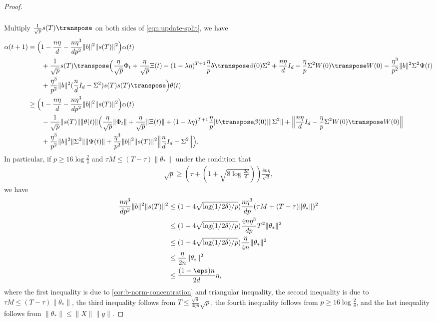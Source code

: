 \begin{proof}
\begin{align}
\begin{split}
        \end{split}
    \end{align}
    Multiply $\frac{1}{\sqrt{p}} s(T)\transpose$ on both sides of \cref{eqn:update-split}, we have
    \begin{align*}
        \alpha(t+1) & = \Big( 1 - \frac{n\eta}{d} - \frac{n\eta^3}{dp^2} \|b\|^2 \|s(T)\|^2 \Big) \alpha(t) \\
        & \qquad + \frac{1}{\sqrt{p}} s(T)\transpose \Big( \frac{\eta}{\sqrt{p}} \Phi_t + \frac{\eta}{\sqrt p}\Xi(t)  - (1-\lambda\eta)^{T+1} \frac{\eta}{p} b\transpose\beta(0) \Sigma^2 + \frac{n\eta}{d}I_d - \frac{\eta}{p}\Sigma^2 W(0)\transpose W(0) - \frac{\eta^3}{p^2} \|b\|^2 \Sigma^2 \Psi(t) \\
        & \qquad + \frac{\eta^3}{p^2} \|b\|^2 (\frac{n}{d}I_d - \Sigma^2) s(T) s(T)\transpose \Big)\theta(t) \\
        & \geq \Big( 1 - \frac{n\eta}{d} - \frac{n\eta^3}{dp^2} \|b\|^2 \|s(T)\|^2 \Big) \alpha(t) \\
        & \qquad - \frac{1}{\sqrt{p}} \|s(T)\|\|\theta(t)\| \Big( \frac{\eta}{\sqrt{p}} \|\Phi_t\| + \frac{\eta}{\sqrt p} \|\Xi(t)\| + (1-\lambda\eta)^{T+1} \frac{\eta}{p} |b\transpose\beta(0)| \|\Sigma^2\| + \Big\| \frac{n\eta}{d}I_d - \frac{\eta}{p}\Sigma^2 W(0)\transpose W(0) \Big\| \\
        & \qquad + \frac{\eta^3}{p^2} \|b\|^2 \|\Sigma^2\| \|\Psi(t)\| + \frac{\eta^3}{p^2} \|b\|^2 \|s(T)\|^2 \Big\| \frac{n}{d}I_d - \Sigma^2 \Big\| \Big).
    \end{align*}
    In particular, if $p \geq 16\log\frac{2}{\delta}$ and $\tau M \leq (T-\tau) \|\theta_*\|$ under the condition that
    \begin{align*}
        \sqrt{p} \geq \left( \tau + \left(1 + \sqrt{8\log\frac{2d}{\delta}}\right) \right) \frac{8n\eta}{\sqrt{d}},
    \end{align*}
    we have
    \begin{align*}
        \frac{n\eta^3}{dp^2} \|b\|^2 \|s(T)\|^2 & \leq (1 + 4\sqrt{\log(1/2\delta)/p}) \frac{n\eta^3}{dp} (\tau M + (T-\tau) \|\theta_*\|)^2 \\
        & \leq (1 + 4\sqrt{\log(1/2\delta)/p}) \frac{4n\eta^3}{dp} T^2 \|\theta_*\|^2 \\
        & \leq (1 + 4\sqrt{\log(1/2\delta)/p}) \frac{\eta}{4n} \|\theta_*\|^2 \\
        & \leq \frac{\eta}{2n} \|\theta_*\|^2 \\
        & \leq \frac{(1+\eps)n}{2d}\eta,
    \end{align*}
    where the first inequality is due to \cref{cor:b-norm-concentration} and triangular inequality, the second inequality is due to $\tau M \leq (T-\tau) \|\theta_*\|$, the third inequality follows from $T \leq \frac{\sqrt{d}}{4\eta n}\sqrt{p}$, the fourth inequality follows from $p \geq 16\log\frac{2}{\delta}$, and the last inequality follows from $\|\theta_*\| \leq \|X\|\|y\|$.
    

\end{proof}
